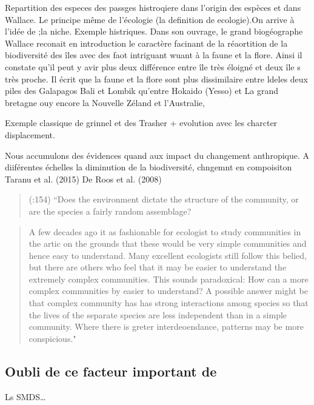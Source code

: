 Repartition des especes des passges histroqiere dans l'origin des
espèces et dans Wallace. Le principe même de l'écologie (la definition
de ecologie).On arrive à l'idée de ;la niche. Exemple histriques. Dans
son ouvrage, le grand biogéographe Wallace reconait en introduction le
caractère facinant de la réaortition de la biodiversité des îles avec
des faot intriguant wuant à la faune et la flore. Ainsi il constate
qu'il peut y avir plus deux différence entre île très éloigné et deux
île s très proche. Il écrit que la faune et la flore sont plus
dissimilaire entre ldeles deux piles des Galapagos Bali et Lombik
qu'entre Hokaido (Yesso) et La grand bretagne ouy encore la Nouvelle
Zéland et l'Australie,

Exemple classique de grinnel et des Trasher + evolution avec les
charcter displacement.

Nous accumulons des évidences quand aux impact du changement
anthropique. A diiférentes échelles la diminution de la biodiversité,
chngemnt en compoisiton Taranu et al. (2015) De Roos et al. (2008)

\begin{quote}
(:154) ``Does the environment dictate the structure of the community, or
are the species a fairly random assemblage?
\end{quote}

\begin{quote}
A few decades ago it as fashionable for ecologist to study communities
in the artic on the grounds that these would be very simple communities
and hence easy to understand. Many excellent ecologists still follow
this belied, but there are others who feel that it may be easier to
understand the extremely complex communities. This sounds paradoxical:
How can a more complex communities by easier to understand? A possible
answer might be that complex community has has strong interactions among
species so that the lives of the separate species are less independent
than in a simple community. Where there is greter interdeoendance,
patterns may be more conspicious."
\end{quote}

\subsection{Oubli de ce facteur important
de}\label{oubli-de-ce-facteur-important-de}

Ls SMDS\ldots{}

